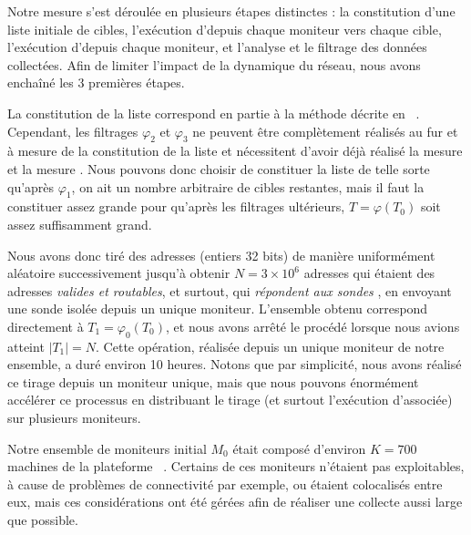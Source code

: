 Notre mesure s'est déroulée en plusieurs étapes distinctes : la constitution
d'une liste initiale de cibles, l'exécution d'\udpping depuis chaque moniteur
vers chaque cible, l'exécution d'\udpexplore depuis chaque moniteur, et
l'analyse et le filtrage des données collectées. Afin de limiter l'impact de la
dynamique du réseau, nous avons enchaîné les 3 premières étapes.

La constitution de la liste correspond en partie à la méthode décrite en
~. Cependant, les filtrages
$\varphi_2$ et $\varphi_3$ ne peuvent être complètement réalisés au fur et à
mesure de la constitution de la liste et nécessitent d'avoir déjà réalisé la
mesure \udpping et la mesure \udpexplore. Nous pouvons donc choisir de
constituer la liste de telle sorte qu'après $\varphi_1$, on ait un nombre
arbitraire de cibles restantes, mais il faut la constituer assez grande pour
qu'après les filtrages ultérieurs, $T = \varphi(T_0)$ soit assez suffisamment
grand.

Nous avons donc tiré des adresses \ip (entiers 32 bits) de manière
uniformément aléatoire successivement jusqu'à obtenir $N = 3 \times 10^6$
adresses qui étaient des adresses \emph{valides et routables}, et surtout, qui
\emph{répondent aux sondes \udpping}, en envoyant une sonde isolée depuis un
unique moniteur. L'ensemble obtenu correspond directement à $T_1 =
\varphi_0(T_0)$, et nous avons arrêté le procédé lorsque nous avions atteint
$|T_1| = N$. Cette opération, réalisée depuis un unique moniteur de notre
ensemble, a duré environ 10 heures. Notons que par simplicité, nous avons
réalisé ce tirage depuis un moniteur unique, mais que nous pouvons énormément
accélérer ce processus en distribuant le tirage (et surtout l'exécution
d'\udpping associée) sur plusieurs moniteurs.

Notre ensemble de moniteurs initial $M_0$ était composé d'environ $K = 700$
machines de la plateforme \planetlab~\cite{planetlab}. Certains de ces moniteurs
n'étaient pas exploitables, à cause de problèmes de connectivité par exemple, ou
étaient colocalisés entre eux, mais ces considérations ont été gérées
\aposteriori afin de réaliser une collecte aussi large que possible.

